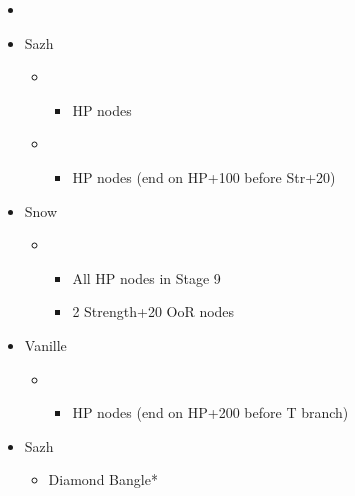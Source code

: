 \begin{menu}
	\begin{itemize}
	\paradigm
		\begin{itemize}
			\item {}%
				{\paradigmline{\com}{\com}{\com}}%
				{\paradigmline[4]{\com}{(\sen)}{(\med)}}%
				{\paradigmline{(\com)}{\sen}{(\rav)}}%
				{\paradigmline{\rav}{(\sen)}{\rav}}%
				{\paradigmline{(\syn)}{\sen}{(\med)}}%
				{\paradigmline{(\sen)}{\sen}{(\sen)}}%
		\end{itemize}
	\crystarium
		\begin{itemize}
			\item Sazh
				\begin{itemize}
					\item \rav
						\begin{itemize}
							\item HP nodes
						\end{itemize}
					\item \syn
						\begin{itemize}
							\item HP nodes (end on HP+100 before Str+20)
						\end{itemize}
				\end{itemize}
			\item Snow
				\begin{itemize}
					\item \com
						\begin{itemize}
							\item All HP nodes in Stage 9
							\item 2 Strength+20 OoR nodes
						\end{itemize}
				\end{itemize}
			\item Vanille
				\begin{itemize}
					\item \sab
						\begin{itemize}
							\item HP nodes (end on HP+200 before T branch)
						\end{itemize}
				\end{itemize}								
		\end{itemize}
	\equip
		\begin{itemize}
			\item Sazh
				\begin{itemize}
					\item Diamond Bangle*

\end{itemize}
\end{itemize}
\end{itemize}
\end{menu}

